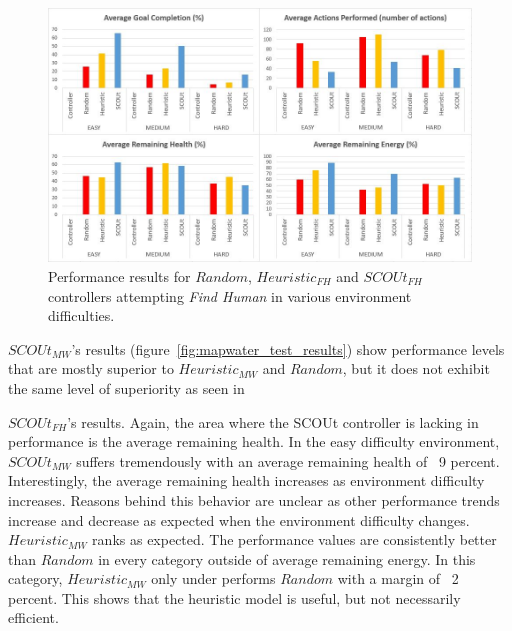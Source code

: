 \begin{figure}[H]
  \centering
  \includegraphics[width=1.0\columnwidth]{Figures/Results/Experiment1/FindHuman.JPG}
  \caption[Experiment 1 Results: $SCOUt_{FH}$]{Performance results for $Random$, $Heuristic_{FH}$ and $SCOUt_{FH}$ controllers attempting \textit{Find Human} in various environment difficulties.}
  \label{fig:findhuman_test_results}
\end{figure}


$SCOUt_{MW}$'s results (figure~\ref{fig:mapwater_test_results}) show performance levels that are mostly superior to $Heuristic_{MW}$ and $Random$, but it does not exhibit the same level of superiority as seen in

\noindent
$SCOUt_{FH}$'s results.
Again, the area where the SCOUt controller is lacking in performance is the average remaining health.
In the easy difficulty environment, $SCOUt_{MW}$ suffers tremendously with an average remaining health of ~9 percent.
Interestingly, the average remaining health increases as environment difficulty increases.
Reasons behind this behavior are unclear as other performance trends increase and decrease as expected when the environment difficulty changes.
$Heuristic_{MW}$ ranks as expected.
The performance values are consistently better than $Random$ in every category outside of average remaining energy.
In this category, $Heuristic_{MW}$ only under performs $Random$ with a margin of ~2 percent.
This shows that the heuristic model is useful, but not necessarily efficient.

